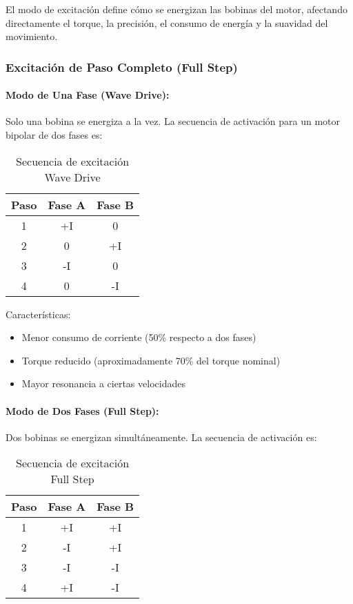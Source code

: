 El modo de excitación define cómo se energizan las bobinas del motor, afectando directamente el torque, la precisión, el consumo de energía y la suavidad del movimiento.

\subsubsection{Excitación de Paso Completo (Full Step)}

\paragraph{Modo de Una Fase (Wave Drive):}

Solo una bobina se energiza a la vez. La secuencia de activación para un motor bipolar de dos fases es:

\begin{table}[ht]
\centering
\caption{Secuencia de excitación Wave Drive}
\begin{tabular}{|c|c|c|}
\hline
\textbf{Paso} & \textbf{Fase A} & \textbf{Fase B} \\
\hline
1 & +I & 0 \\
2 & 0 & +I \\
3 & -I & 0 \\
4 & 0 & -I \\
\hline
\end{tabular}
\end{table}

Características:
\begin{itemize}
    \item Menor consumo de corriente (50\% respecto a dos fases)
    \item Torque reducido (aproximadamente 70\% del torque nominal)
    \item Mayor resonancia a ciertas velocidades
\end{itemize}

\paragraph{Modo de Dos Fases (Full Step):}

Dos bobinas se energizan simultáneamente. La secuencia de activación es:

\begin{table}[ht]
\centering
\caption{Secuencia de excitación Full Step}
\begin{tabular}{|c|c|c|}
\hline
\textbf{Paso} & \textbf{Fase A} & \textbf{Fase B} \\
\hline
1 & +I & +I \\
2 & -I & +I \\
3 & -I & -I \\
4 & +I & -I \\
\hline
\end{tabular}
\end{table}

